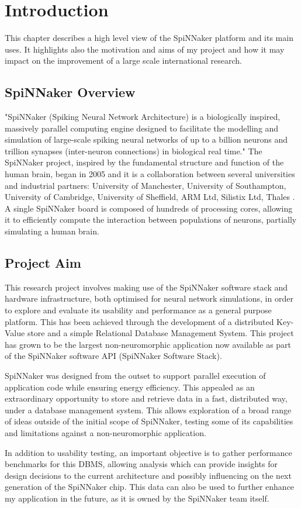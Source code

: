 \chapter{Introduction}
\label{cha:intro}

This chapter describes a high level view of the SpiNNaker platform and its main uses. It highlights also the motivation and aims of my project and how it may impact on the improvement of a large scale international research.

\section{SpiNNaker Overview}
\label{sec:overview}

"SpiNNaker (Spiking Neural Network Architecture) is a biologically inspired, massively parallel computing engine designed to facilitate the modelling and simulation of large-scale spiking neural networks of up to a billion neurons and trillion synapses (inter-neuron connections) in biological real time." \cite{painkras} The SpiNNaker project, inspired by the fundamental structure and function of the human brain, began in 2005 and it is a collaboration between several universities and industrial partners: University of Manchester, University of Southampton, University of Cambridge, University of Sheffield, ARM Ltd, Silistix Ltd, Thales \cite{spinnproject}. A single SpiNNaker board is composed of hundreds of processing cores, allowing it to efficiently compute the interaction between populations of neurons, partially simulating a human brain.

\section{Project Aim}
\label{sec:aim}

This research project involves making use of the SpiNNaker software stack and hardware infrastructure, both optimised for neural network simulations, in order to explore and evaluate its usability and performance as a general purpose platform. This has been achieved through the development of a distributed Key-Value store and a simple Relational Database Management System. 
This project has grown to be the largest non-neuromorphic application now available as part of the SpiNNaker software API (SpiNNaker Software Stack).

SpiNNaker was designed from the outset to support parallel execution of application code while ensuring energy efficiency. This appealed as an extraordinary opportunity to store and retrieve data in a fast, distributed way, under a database management system. This allows exploration of a broad range of ideas outside of the initial scope of SpiNNaker, testing some of its capabilities and limitations against a non-neuromorphic application.

In addition to usability testing, an important objective is to gather performance benchmarks for this DBMS, allowing analysis which can provide insights for design decisions to the current architecture and possibly influencing on the next generation of the SpiNNaker chip. This data can also be used to further enhance my application in the future, as it is owned by the SpiNNaker team itself.